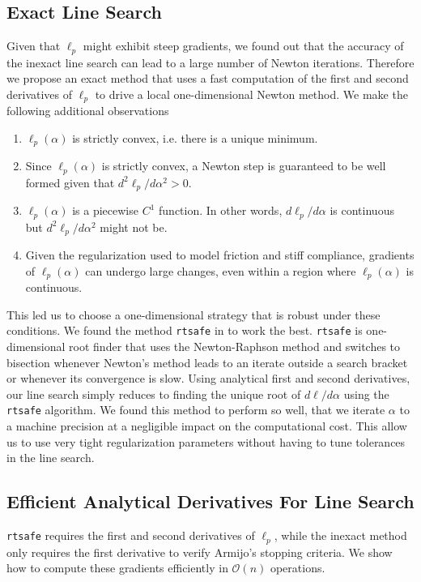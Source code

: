 \subsection{Exact Line Search}
Given that $\ell_p$ might exhibit steep gradients, we found out that the
accuracy of the inexact line search can lead to a large number of Newton
iterations.
Therefore we propose an exact method that uses a fast computation of the
first and second derivatives of $\ell_p$ to drive a local one-dimensional Newton
method. We make the following additional observations
\begin{enumerate}
	\item $\ell_p(\alpha)$ is strictly convex, i.e. there is a unique minimum.
	\item Since $\ell_p(\alpha)$ is strictly convex, a Newton step is guaranteed
	to be well formed given that $d^2\ell_p/d\alpha^2>0$.
	\item $\ell_p(\alpha)$ is a piecewise $C^1$ function. In other words,
	$d\ell_p/d\alpha$ is continuous but $d^2\ell_p/d\alpha^2$ might not be.	
	\item Given the regularization used to model friction and stiff compliance,
	gradients of $\ell_p(\alpha)$ can undergo large changes, even within a
	region where $\ell_p(\alpha)$ is continuous.
\end{enumerate}

This led us to choose a one-dimensional strategy that is robust under these
conditions. We found the method \verb;rtsafe; in \cite[\S
9.4]{bib:numerical_recipes} to work the best. \verb;rtsafe; is one-dimensional
root finder that uses the Newton-Raphson method and switches to bisection
whenever Newton's method leads to an iterate outside a search bracket or
whenever its convergence is slow. Using analytical first and second derivatives,
our line search simply reduces to finding the unique root of $d\ell/d\alpha$
using the \verb;rtsafe; algorithm. We found this method to perform so well, that
we iterate $\alpha$ to a machine precision at a negligible impact on the
computational cost. This allow us to use very tight regularization parameters
without having to tune tolerances in the line search.

\subsection{Efficient Analytical Derivatives For Line Search}

\verb;rtsafe; requires the first and second derivatives of
$\ell_p$, while the inexact method only requires the first derivative to verify
Armijo's stopping criteria. We show how to compute these gradients efficiently
in $\mathcal{O}(n)$ operations.

